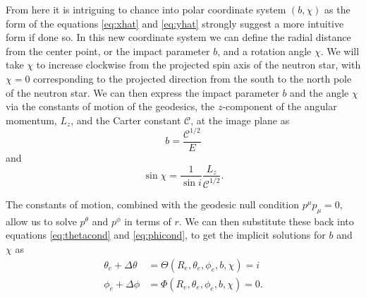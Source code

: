 \documentclass[iop, usenatbib]{emulateapj}
\newcommand{\be}{\begin{equation}}
\newcommand{\ee}{\end{equation}}
\newcommand{\Ca}{\ensuremath{\mathcal{C}}}
\begin{document}
From here it is intriguing to chance into polar coordinate system $(b, \chi)$ as the form of the equations \eqref{eq:xhat} and \eqref{eq:yhat} strongly suggest a more intuitive form if done so.
In this new coordinate system we can define the radial distance from the center point, or the impact parameter $b$, and a rotation angle $\chi$.
We will take $\chi$ to increase clockwise from the projected spin axis of the neutron star, with $\chi=0$ corresponding to the projected direction from the south to the north pole of the neutron star.
We can then express the impact parameter $b$ and the angle $\chi$ via the constants of motion of the geodesics, the $z$-component of the angular momentum, $L_z$, and the Carter constant $\Ca$, at the image plane as
\be
b = \frac{\Ca^{1/2}}{E}
\ee
and
\be
\sin \chi = \frac{1}{\sin i} \frac{L_z}{\Ca^{1/2}}.
\ee

The constants of motion, combined with the geodesic null condition $p^\mu p_\mu = 0$, allow us to solve $p^\theta$ and $p^\phi$ in terms of $r$.
We can then substitute these back into equations \eqref{eq:thetacond} and \eqref{eq:phicond}, to get the implicit solutions for $b$ and $\chi$ as
\begin{align}
\theta_e + \Delta\theta &= \Theta(R_e, \theta_e, \phi_e, b, \chi) = i\\
\phi_e + \Delta\phi     &= \Phi(R_e, \theta_e, \phi_e, b, \chi) = 0.
\end{align}
\end{document}
